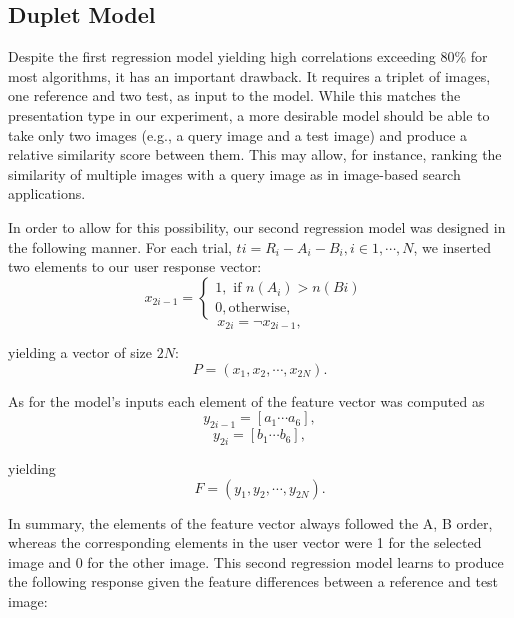 \subsection{Duplet Model}
Despite the first regression model yielding high correlations exceeding 80\% for most algorithms, it has an important drawback. It requires a triplet of images, one reference and two test, as input to the model. While this matches the presentation type in our experiment, a more desirable model should be able to take only two images (e.g., a query image and a test image) and produce a relative similarity score between them. This may allow, for instance, ranking the similarity of multiple images with a query image as in image-based search applications.

In order to allow for this possibility, our second regression model was designed in the following manner.
For each trial, $ti = R_i - A_i - B_i, i \in {1, \cdots , N}$, we inserted two elements to our user response vector:
\begin{equation}
    x_{2i-1} = \begin{cases} 
    1, \text{ if $n(A_i) > n(Bi)$ } \\
    0, \text{otherwise},
    \end{cases}
\end{equation}
\begin{equation}
    x_{2i} = \neg  x_{2i-1},
\end{equation}
    

yielding a vector of size $2N$:
\begin{equation}
   P = (x_1, x_2,\cdots, x_{2N} ). 
\end{equation}

As for the model’s inputs each element of the feature vector was computed as
\begin{equation}
    y_{2i-1} = [a_1 \cdots a_6], 
\end{equation}
\begin{equation}
    y_{2i} = [b_1 \cdots b_6], 
\end{equation}


yielding
\begin{equation}
    F = (y_1, y_2, \cdots , y_{2N} ).
\end{equation}

In summary, the elements of the feature vector always followed the A, B order, whereas the corresponding elements in the user vector were 1 for the selected image and 0 for the other image. This second regression model learns to produce the following response given the feature differences between a reference and test image:

